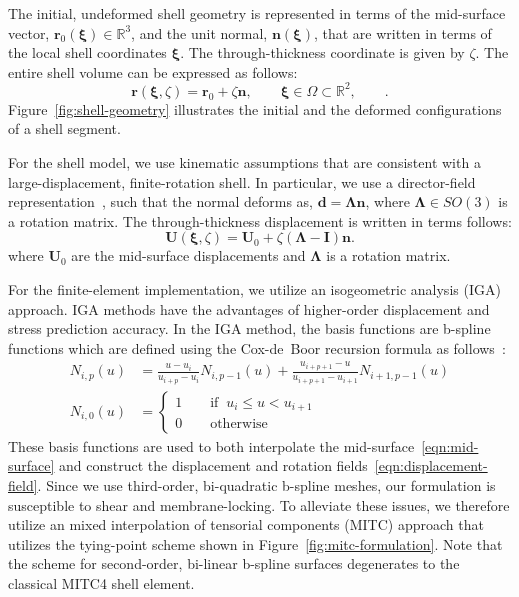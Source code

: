 \documentclass[]{aiaa-tc}
\newcommand{\f}{\frac}
\newcommand{\mb}{\mathbf}
\newcommand{\mbs}{\boldsymbol}
\begin{document}
The initial, undeformed shell geometry is represented in terms of the
mid-surface vector, $\mb{r}_{0}(\mbs{\xi}) \in \mathbb{R}^{3}$, and
the unit normal, $\mb{n}(\mbs{\xi})$, that are written in terms of the
local shell coordinates $\mbs{\xi}$. The through-thickness coordinate
is given by $\zeta$. The entire shell volume can be expressed as
follows:
%
\begin{equation} 
  \mb{r}(\mbs{\xi}, \zeta) = 
  \mb{r}_{0} + \zeta \mb{n}, 
  \qquad \mbs{\xi} \in \Omega \subset \mathbb{R}^{2}, \qquad.
  \label{eqn:mid-surface}
\end{equation}
Figure~\ref{fig:shell-geometry} illustrates the initial and the deformed
configurations of a shell segment. 

For the shell model, we use kinematic assumptions that are consistent
with a large-displacement, finite-rotation shell. In particular, we
use a director-field representation~\cite{Simo:1989:SRG1}, such that
the normal deforms as, $\mb{d} = \mbs{\Lambda} \mb{n}$, where
$\mbs{\Lambda} \in SO(3)$ is a rotation matrix. The through-thickness
displacement is written in terms follows:
%
\begin{equation*}
  \label{eqn:displacement-field}
  \mb{U}(\mbs{\xi}, \zeta) = \mb{U}_{0} + \zeta (\mbs{\Lambda} - \mb{I}) \mb{n}.
\end{equation*}
where $\mb{U}_{0}$ are the mid-surface displacements and $\mbs{\Lambda}$ is
a rotation matrix.

For the finite-element implementation, we utilize an isogeometric
analysis (IGA) approach. IGA methods have the advantages of
higher-order displacement and stress prediction accuracy. In the IGA
method, the basis functions are b-spline functions which are defined
using the Cox-de~Boor recursion formula as follows~\cite{NURBSbook}:
%
\begin{equation}
  \label{eqn:b-spline-basis}
  \begin{aligned}
    N_{i,p}(u) & = \f{u - u_{i}}{u_{i+p} - u_{i}} N_{i,p-1}(u) + \f{u_{i+p+1} - u}{u_{i+p+1} - u_{i+1}}N_{i+1,p-1}(u) \\
    N_{i,0}(u) & = \left\{ 
      \begin{array}{l} 
        1 \qquad \text{if}\;\; u_{i} \le u < u_{i+1} \\
        0 \qquad \text{otherwise}
      \end{array} \right.
  \end{aligned}
\end{equation}
%
These basis functions are used to both interpolate the
mid-surface~\eqref{eqn:mid-surface} and construct the displacement and
rotation fields~\eqref{eqn:displacement-field}. Since we use
third-order, bi-quadratic b-spline meshes, our formulation is
susceptible to shear and membrane-locking. To alleviate these issues,
we therefore utilize an mixed interpolation of tensorial components
(MITC) approach that utilizes the tying-point scheme shown in
Figure~\ref{fig:mitc-formulation}.  Note that the scheme for
second-order, bi-linear b-spline surfaces degenerates to the classical
MITC4 shell element.
\end{document}
